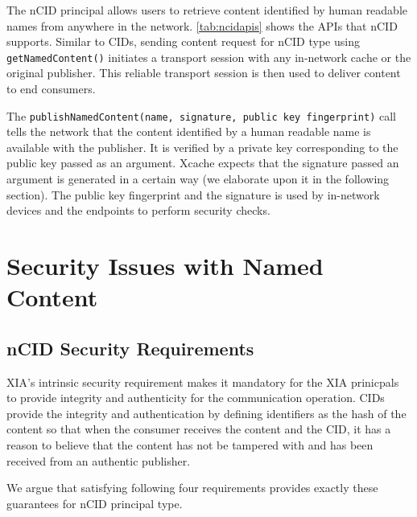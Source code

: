 The nCID principal allows users to retrieve content identified by
human readable names from anywhere in the network. \ref{tab:ncidapis}
shows the APIs that nCID supports. Similar to CIDs, sending content
request for nCID type using \texttt{getNamedContent()} initiates a
transport session with any in-network cache or the original
publisher. This reliable transport session is then used to deliver
content to end consumers.

The \texttt{publishNamedContent(name, signature, public key
  fingerprint)} call tells the network that the content identified by
a human readable name is available with the publisher. It is verified
by a private key corresponding to the public key passed as an
argument. Xcache expects that the signature passed an argument is
generated in a certain way (we elaborate upon it in the following
section). The public key fingerprint and the signature is used by
in-network devices and the endpoints to perform security checks.

\section{Security Issues with Named Content}

\subsection{nCID Security Requirements}

XIA’s intrinsic security requirement makes it mandatory for the XIA
prinicpals to provide integrity and authenticity for the communication
operation. CIDs provide the integrity and authentication by defining
identifiers as the hash of the content so that when the consumer
receives the content and the CID, it has a reason to believe that the
content has not be tampered with and has been received from an
authentic publisher.

We argue that satisfying following four requirements provides exactly
these guarantees for nCID principal type.

